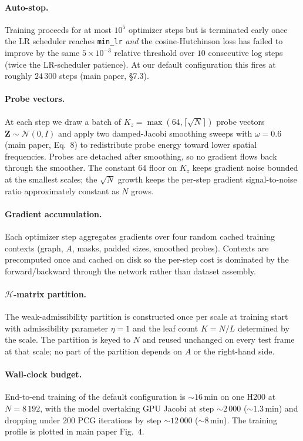 \documentclass[acmtog]{acmart}
\begin{document}
\paragraph{Auto-stop.}
Training proceeds for at most $10^5$ optimizer steps but is terminated early once
the LR scheduler reaches \texttt{min\_lr} \emph{and} the cosine-Hutchinson loss
has failed to improve by the same $5\!\times\!10^{-3}$ relative threshold over
$10$ consecutive log steps (twice the LR-scheduler patience). At our default
configuration this fires at roughly $24\,300$ steps (main paper, \S7.3).

\paragraph{Probe vectors.}
At each step we draw a batch of $K_z\!=\!\max(64, \lceil\sqrt{N}\rceil)$ probe
vectors $\mathbf{Z}\!\sim\!\mathcal{N}(0, I)$ and apply two damped-Jacobi
smoothing sweeps with $\omega\!=\!0.6$ (main paper, Eq.~8) to redistribute probe
energy toward lower spatial frequencies. Probes are detached after smoothing, so
no gradient flows back through the smoother. The constant $64$ floor on $K_z$
keeps gradient noise bounded at the smallest scales; the $\sqrt{N}$ growth keeps
the per-step gradient signal-to-noise ratio approximately constant as $N$ grows.

\paragraph{Gradient accumulation.}
Each optimizer step aggregates gradients over four random cached training
contexts (graph, $A$, masks, padded sizes, smoothed probes). Contexts are
precomputed once and cached on disk so the per-step cost is dominated by the
forward/backward through the network rather than dataset assembly.

\paragraph{$\mathcal{H}$-matrix partition.}
The weak-admissibility partition is constructed once per scale at training start
with admissibility parameter $\eta\!=\!1$ and the leaf count $K\!=\!N/L$
determined by the scale. The partition is keyed to $N$ and reused unchanged on
every test frame at that scale; no part of the partition depends on $A$ or the
right-hand side.

\paragraph{Wall-clock budget.}
End-to-end training of the default configuration is $\sim\!16$\,min on one
H200 at $N\!=\!8\,192$, with the model overtaking GPU Jacobi at step
$\sim\!2\,000$ ($\sim\!1.3$\,min) and dropping under $200$ PCG iterations by
step $\sim\!12\,000$ ($\sim\!8$\,min). The training profile is plotted in main
paper Fig.~4.
\end{document}
